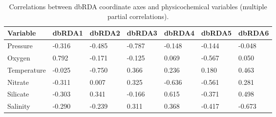 \begin{table}[!ht]
\centering
\sffamily
\caption[Correlations between dbRDA axes and physicochemical variables]{Correlations between dbRDA coordinate axes and physicochemical variables (multiple partial correlations).}
\label{tab:dbRDAcorrs}
\begin{tabu}{lZZZZZZ}
\toprule
\textbf{Variable} & \textbf{dbRDA1} & \textbf{dbRDA2} & \textbf{dbRDA3} & \textbf{dbRDA4} & \textbf{dbRDA5} & \textbf{dbRDA6}\\
\midrule
Pressure & -0.316 & -0.485 & -0.787 & -0.148 & -0.144 & -0.048\\
Oxygen & 0.792 & -0.171 & -0.125 & 0.069 & -0.567 & 0.050\\
Temperature & -0.025 & -0.750 & 0.366 & 0.236 & 0.180 & 0.463\\
Nitrate & -0.311 & 0.007 & 0.325 & -0.636 & -0.561 & 0.281\\
Silicate & -0.303 & 0.341 & -0.166 & 0.615 & -0.371 & 0.498\\
Salinity & -0.290 & -0.239 & 0.311 & 0.368 & -0.417 & -0.673\\
\bottomrule
\end{tabu}
\end{table}
